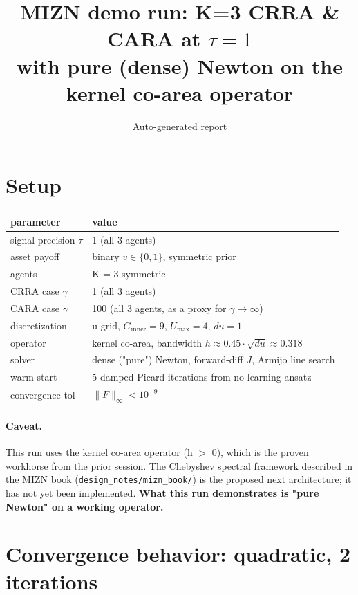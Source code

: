 \documentclass[11pt]{article}
\title{MIZN demo run: K=3 CRRA \& CARA at $\tau=1$\\
\large with pure (dense) Newton on the kernel co-area operator}
\author{Auto-generated report}
\date{}
\begin{document}
\maketitle

\section*{Setup}

\begin{center}\begin{tabular}{ll}\toprule
parameter & value \\\midrule
signal precision $\tau$ & 1 (all 3 agents) \\
asset payoff & binary $v \in \{0, 1\}$, symmetric prior \\
agents & K = 3 symmetric \\
CRRA case $\gamma$ & 1 (all 3 agents) \\
CARA case $\gamma$ & 100 (all 3 agents, as a proxy for $\gamma \to \infty$) \\
discretization & u-grid, $G_{\text{inner}} = 9$, $U_{\max} = 4$, $du = 1$ \\
operator & kernel co-area, bandwidth $h \approx 0.45 \cdot \sqrt{du} \approx 0.318$ \\
solver & dense ("pure") Newton, forward-diff $J$, Armijo line search \\
warm-start & 5 damped Picard iterations from no-learning ansatz \\
convergence tol & $\|F\|_\infty < 10^{-9}$ \\
\bottomrule\end{tabular}\end{center}

\paragraph{Caveat.} This run uses the kernel co-area operator (h $>$ 0), which is
the proven workhorse from the prior session. The Chebyshev spectral
framework described in the MIZN book (\texttt{design\_notes/mizn\_book/})
is the proposed next architecture; it has not yet been implemented.
\textbf{What this run demonstrates is "pure Newton" on a working operator.}

\section{Convergence behavior: quadratic, 2 iterations}
\end{document}

